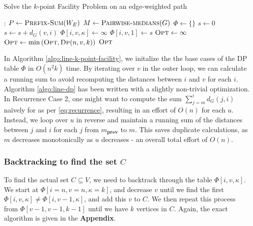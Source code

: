 \documentclass[9pt]{article}
\begin{document}
\begin{algorithm}[H]
    \caption{Solve the $k$-point Facility Problem on an edge-weighted path}
    \label{algo:line-k-point-facility}
    \begin{algorithmic}[1]
        :
            \State $P \gets \textsc{Prefix-Sum}(W_{E})$ 
            \State $M \gets \textsc{Pairwise-medians}(G)$
            \State $\Phi \gets \{ \}$ 
                \State $s \gets 0$
                    \State $s \gets s + d_{G}(v, i)$
                            \State $\Phi[i, v, \kappa] \gets \infty$ 
                        \EndIf
                    \EndFor
                    \State $\Phi[i, v, 1] \gets s$ 
                \EndFor
            \EndFor
            \State $\textsc{Opt} \gets \infty$
                \State $\textsc{Opt} \gets \min \left( \textsc{Opt}, \Call{Dp}{n, v, k} \right)$
            \EndFor
            \State \Return $\textsc{Opt}$
        \EndProcedure
    \end{algorithmic}
\end{algorithm}
\vfill
\pagebreak
\hspace*{-19pt}
In Algorithm \ref{algo:line-k-point-facility}, we initalize the the base cases of the DP table
$\Phi$ in $O(n^{2} k)$ time. By iterating over $v$ in the outer loop, we can calculate a running
sum to avoid recomputing the distances between $i$ and $v$ for each $i$. \\
Algorithm \ref{algo:line-dp} has been written with a slightly non-trivial optimization. In
Recurrence Case 2, one might want to compute the sum $\sum_{j=m}^{i} d_{G}(j, i)$ naïvely for
as per \ref{eq:recurrence}, resulting in an effort of $O(n)$ for each $u$. Instead, we loop
over $u$ in reverse and maintain a running sum of the distances between $j$ and $i$ for each
$j$ from $m_{\textbf{prev}}$ to $m$. This saves duplicate calculations, as $m$ decreases
monotonically as $u$ decreases - an overall total effort of $O(n)$.

\subsubsection*{Backtracking to find the set $C$}
To find the actual set $C \subseteq V$, we need to backtrack through the table $\Phi[i, v, \kappa]$.
We start at $\Phi[i=n, v=n, \kappa=k]$, and decrease $v$ until we find the first
$\Phi[i, v, \kappa] \neq \Phi[i, v-1, \kappa]$, and add this $v$ to $C$. We then repeat this
process from $\Phi[v-1, v-1, k-1]$ until we have $k$ vertices in $C$. Again, the exact algorithm
is given in the \textbf{Appendix}.
\end{document}
